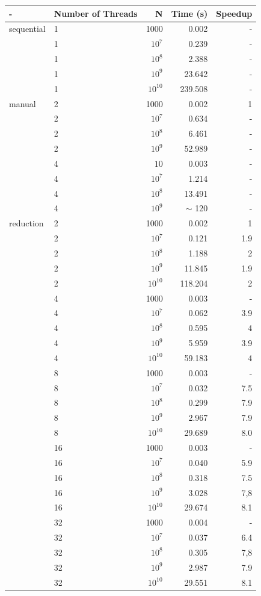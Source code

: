 \documentclass{article}
\begin{document}
	\begin{tabular}{|l|l|r|r|r|}
		\hline
		- & Number of Threads & N & Time (s) & Speedup \\
		\hline
		sequential & 1 & 1000 & 0.002 & - \\
		& 1 & $10^{7}$ & 0.239 & - \\
		& 1 & $10^{8}$ & 2.388 & - \\
		& 1 & $10^{9}$ & 23.642 & - \\
		& 1 & $10^{10}$ & 239.508 & - \\
		\hline
		manual & 2 & 1000 & 0.002 & 1 \\
		 & 2 & $10^{7}$ & 0.634 & - \\
		 & 2 & $10^{8}$ & 6.461 & - \\
		 & 2 & $10^{9}$ & 52.989 & - \\
		 & 4 & $10$ & 0.003 & - \\
		 & 4 & $10^{7}$ & 1.214 & - \\
		 & 4 & $10^{8}$ & 13.491 & - \\
		 & 4 & $10^{9}$ & $\sim$ 120 & - \\
		\hline
		reduction & 2 & 1000 & 0.002 & 1 \\
		 & 2 & $10^{7}$ & 0.121 & 1.9 \\
		 & 2 & $10^{8}$ & 1.188 & 2 \\
		 & 2 & $10^{9}$ & 11.845 & 1.9 \\
		 & 2 & $10^{10}$ & 118.204 & 2 \\
		 & 4 & 1000 & 0.003 & - \\
		 & 4 & $10^{7}$ & 0.062 & 3.9 \\
		 & 4 & $10^{8}$ & 0.595 & 4 \\
		 & 4 & $10^{9}$ & 5.959 & 3.9 \\
		 & 4 & $10^{10}$ & 59.183 & 4 \\
		 & 8 & 1000 & 0.003 & - \\
		 & 8 & $ 10^{7} $ & 0.032 & 7.5 \\
		 & 8 & $ 10^{8} $ & 0.299 & 7.9 \\
		 & 8 & $ 10^{9} $ & 2.967 & 7.9 \\
		 & 8 & $10^{10}$ & 29.689 & 8.0 \\
		 & 16 & 1000 & 0.003 & - \\
		 & 16 & $ 10^{7} $ & 0.040 & 5.9 \\
		 & 16 & $ 10^{8} $ & 0.318 & 7.5 \\
		 & 16 & $ 10^{9} $ & 3.028 & 7,8 \\
		 & 16 & $10^{10}$ & 29.674 & 8.1\\
		 & 32 & 1000 & 0.004 & - \\
		 & 32 & $ 10^{7} $ & 0.037 & 6.4 \\
		 & 32 & $ 10^{8} $ & 0.305 & 7,8 \\
		 & 32 & $ 10^{9} $ & 2.987 & 7.9 \\
		 & 32 & $10^{10}$ & 29.551 & 8.1 \\
		\hline
	\end{tabular}
\end{document}
